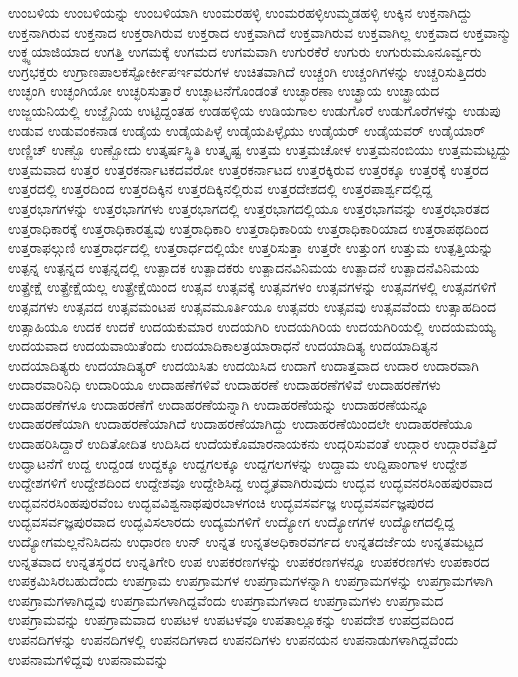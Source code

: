 {ಉಂಬಳಿಯ
ಉಂಬಳಿಯನ್ನು
ಉಂಬಳಿಯಾಗಿ
ಉಂಮರಹಳ್ಳಿ
ಉಂಮರಹಳ್ಳಿಉಮ್ಮಡಹಳ್ಳಿ
ಉಕ್ಕಿನ
ಉಕ್ತನಾಗಿದ್ದು
ಉಕ್ತನಾಗಿರುವ
ಉಕ್ತನಾದ
ಉಕ್ತರಾಗಿರುವ
ಉಕ್ತರಾದ
ಉಕ್ತವಾಗಿದೆ
ಉಕ್ತವಾಗಿರುವ
ಉಕ್ತವಾಗಿಲ್ಲ
ಉಕ್ತವಾದ
ಉಕ್ತವಾನ್ಮು
ಉಕ್ಥ್ಯಯಾಜಿಯಾದ
ಉಗತ್ತಿ
ಉಗಮಕ್ಕೆ
ಉಗಮದ
ಉಗಮವಾಗಿ
ಉಗುರಕೆರೆ
ಉಗುರು
ಉಗುರುಮೂನೂರ್ವ್ವರು
ಉಗ್ರಭಕ್ತರು
ಉಗ್ರಾಣಪಾಲಕಸ್ಟೋರ್ಕೀಪರ್ಇವರುಗಳ
ಉಚಿತವಾಗಿದೆ
ಉಚ್ಚಂಗಿ
ಉಚ್ಚಂಗಿಗಳನ್ನು
ಉಚ್ಚರಿಸುತ್ತಿದರು
ಉಚ್ಛಂಗಿ
ಉಚ್ಛಂಗಿಯೋ
ಉಚ್ಛರಿಸುತ್ತಾರೆ
ಉಚ್ಛಾಟನೆಗೊಂಡಂತೆ
ಉಚ್ಛಾರಣಾ
ಉಚ್ಛ್ರಾಯ
ಉಚ್ಛ್ರಾಯದ
ಉಜ್ಜಯನಿಯಲ್ಲಿ
ಉಜ್ಜೈನಿಯ
ಉಟ್ಟಿದ್ದಂತಹ
ಉಡಹಳ್ಳಿಯ
ಉಡಿಯಗಾಲ
ಉಡುಗೊರೆ
ಉಡುಗೊರೆಗಳನ್ನು
ಉಡುಪು
ಉಡುವ
ಉಡುವಂಕನಾಡ
ಉಡೈಯ
ಉಡೈಯಪಿಳ್ಳೆ
ಉಡೈಯಪಿಳ್ಳೈಯು
ಉಡೈಯರ್
ಉಡೈಯವರ್
ಉಡೈಯಾರ್
ಉಣ್ಣಿಚ್
ಉಣ್ಬೊ
ಉಣ್ಬೋದು
ಉತ್ಕರ್ಷಸ್ಥಿತಿ
ಉತ್ಕೃಷ್ಟ
ಉತ್ತಮ
ಉತ್ತಮಚೋಳ
ಉತ್ತಮನಂಬಿಯು
ಉತ್ತಮಮಟ್ಟದ್ದು
ಉತ್ತಮವಾದ
ಉತ್ತರ
ಉತ್ತರಕರ್ನಾಟಕದವರೋ
ಉತ್ತರಕರ್ನಾಟದ
ಉತ್ತರಕ್ಕಿರುವ
ಉತ್ತರಕ್ಕೂ
ಉತ್ತರಕ್ಕೆ
ಉತ್ತರದ
ಉತ್ತರದಲ್ಲಿ
ಉತ್ತರದಿಂದ
ಉತ್ತರದಿಕ್ಕಿನ
ಉತ್ತರದಿಕ್ಕಿನಲ್ಲಿರುವ
ಉತ್ತರದೇಶದಲ್ಲಿ
ಉತ್ತರಪಾರ್ಶ್ವದಲ್ಲಿದ್ದ
ಉತ್ತರಭಾಗಗಳನ್ನು
ಉತ್ತರಭಾಗಗಳು
ಉತ್ತರಭಾಗದಲ್ಲಿ
ಉತ್ತರಭಾಗದಲ್ಲಿಯೂ
ಉತ್ತರಭಾಗವನ್ನು
ಉತ್ತರಭಾರತದ
ಉತ್ತರಾಧಿಕಾರಕ್ಕೆ
ಉತ್ತರಾಧಿಕಾರತ್ವವು
ಉತ್ತರಾಧಿಕಾರಿ
ಉತ್ತರಾಧಿಕಾರಿಯ
ಉತ್ತರಾಧಿಕಾರಿಯಾದ
ಉತ್ತರಾಪಥದಿಂದ
ಉತ್ತರಾಫಲ್ಗುಣಿ
ಉತ್ತರಾರ್ಧದಲ್ಲಿ
ಉತ್ತರಾರ್ಧದಲ್ಲಿಯೇ
ಉತ್ತರಿಸುತ್ತಾ
ಉತ್ತರೇ
ಉತ್ತುಂಗ
ಉತ್ತುಮ
ಉತ್ಪತ್ತಿಯನ್ನು
ಉತ್ಪನ್ನ
ಉತ್ಪನ್ನದ
ಉತ್ಪನ್ನದಲ್ಲಿ
ಉತ್ಪಾದಕ
ಉತ್ಪಾದಕರು
ಉತ್ಪಾದನವಿನಿಮಯ
ಉತ್ಪಾದನೆ
ಉತ್ಪಾದನೆವಿನಿಮಯ
ಉತ್ಪ್ರೇಕ್ಷೆ
ಉತ್ಪ್ರೇಕ್ಷೆಯಲ್ಲ
ಉತ್ಪ್ರೇಕ್ಷೆಯಿಂದ
ಉತ್ಸವ
ಉತ್ಸವಕ್ಕೆ
ಉತ್ಸವಗಳಂ
ಉತ್ಸವಗಳನ್ನು
ಉತ್ಸವಗಳಲ್ಲಿ
ಉತ್ಸವಗಳಿಗೆ
ಉತ್ಸವಗಳು
ಉತ್ಸವದ
ಉತ್ಸವಮಂಟಪ
ಉತ್ಸವಮೂರ್ತಿಯೂ
ಉತ್ಸವರು
ಉತ್ಸವವು
ಉತ್ಸವವೆಂದು
ಉತ್ಸಾಹದಿಂದ
ಉತ್ಸಾಹಿಯೂ
ಉದಕ
ಉದಕೆ
ಉದಯಕುಮಾರ
ಉದಯಗಿರಿ
ಉದಯಗಿರಿಯ
ಉದಯಗಿರಿಯಲ್ಲಿ
ಉದಯಮಯ್ಯ
ಉದಯವಾದ
ಉದಯವಾಯಿತೆಂದು
ಉದಯಾದಿಕಾಲತ್ರಯಾರಾಧನೆ
ಉದಯಾದಿತ್ಯ
ಉದಯಾದಿತ್ಯನ
ಉದಯಾದಿತ್ಯರು
ಉದಯಾದಿತ್ಯರ್
ಉದಯಿಸಿತು
ಉದಯಿಸಿದ
ಉದಾಗೆ
ಉದಾತ್ತವಾದ
ಉದಾರ
ಉದಾರವಾಗಿ
ಉದಾರವಾರಿನಿಧಿ
ಉದಾರಿಯೂ
ಉದಾಹಣೆಗಳಿವೆ
ಉದಾಹರಣೆ
ಉದಾಹರಣೆಗಳಿವೆ
ಉದಾಹರಣೆಗಳು
ಉದಾಹರಣೆಗಳೂ
ಉದಾಹರಣೆಗೆ
ಉದಾಹರಣೆಯನ್ನಾಗಿ
ಉದಾಹರಣೆಯನ್ನು
ಉದಾಹರಣೆಯನ್ನೂ
ಉದಾಹರಣೆಯಾಗಿ
ಉದಾಹರಣೆಯಾಗಿದೆ
ಉದಾಹರಣೆಯಾಗಿದ್ದು
ಉದಾಹರಣೆಯಿಂದಲೇ
ಉದಾಹರಣೆಯೂ
ಉದಾಹರಿಸಿದ್ದಾರೆ
ಉದಿತೋದಿತ
ಉದಿಸಿದ
ಉದೆಯಕೊಮಾರನಾಯಕನು
ಉದ್ಗರಿಸುವಂತೆ
ಉದ್ಗಾರ
ಉದ್ಗಾರವೆತ್ತಿದೆ
ಉದ್ಘಾಟನೆಗೆ
ಉದ್ದ
ಉದ್ದಂಡ
ಉದ್ದಕ್ಕೂ
ಉದ್ದಗಲಕ್ಕೂ
ಉದ್ದಗಲಗಳನ್ನು
ಉದ್ದಾಮ
ಉದ್ದಿಪಾಂಗಾಳ
ಉದ್ದೇಶ
ಉದ್ದೇಶಗಳಿಗೆ
ಉದ್ದೇಶದಿಂದ
ಉದ್ದೇಶವೂ
ಉದ್ದೇಶಿಸಿದ್ದ
ಉದ್ಧೃತವಾಗಿರುವುದು
ಉದ್ಭವ
ಉದ್ಭವನರಸಿಂಹಪುರವಾದ
ಉದ್ಭವನರಸಿಂಹಪುರವೆಂಬ
ಉದ್ಭವವಿಶ್ವನಾಥಪುರಬಾಳಗಂಚಿ
ಉದ್ಭವಸರ್ವಜ್ಞ
ಉದ್ಭವಸರ್ವಜ್ಞಪುರದ
ಉದ್ಭವಸರ್ವಜ್ಞಪುರವಾದ
ಉದ್ಭವಿಸಲಾರದು
ಉದ್ಯಮಗಳಿಗೆ
ಉದ್ಯೋಗ
ಉದ್ಯೋಗಗಳ
ಉದ್ಯೋಗದಲ್ಲಿದ್ದ
ಉದ್ಯೋಗಮಲ್ಲನೆನಿಸಿದನು
ಉಧಾರಣ
ಉನ್
ಉನ್ನತ
ಉನ್ನತಅಧಿಕಾರವರ್ಗದ
ಉನ್ನತದರ್ಜೆಯ
ಉನ್ನತಮಟ್ಟದ
ಉನ್ನತವಾದ
ಉನ್ನತಸ್ಥರದ
ಉನ್ನತಿಗೇರಿ
ಉಪ
ಉಪಕರಣಗಳನ್ನು
ಉಪಕರಣಗಳನ್ನೂ
ಉಪಕರಣಗಳು
ಉಪಕಾರದ
ಉಪಕ್ರಮಿಸಿರಬಹುದೆಂದು
ಉಪಗ್ರಾಮ
ಉಪಗ್ರಾಮಗಳ
ಉಪಗ್ರಾಮಗಳನ್ನಾಗಿ
ಉಪಗ್ರಾಮಗಳನ್ನು
ಉಪಗ್ರಾಮಗಳಾಗಿ
ಉಪಗ್ರಾಮಗಳಾಗಿದ್ದವು
ಉಪಗ್ರಾಮಗಳಾಗಿದ್ದವೆಂದು
ಉಪಗ್ರಾಮಗಳಾದ
ಉಪಗ್ರಾಮಗಳು
ಉಪಗ್ರಾಮದ
ಉಪಗ್ರಾಮವನ್ನು
ಉಪಗ್ರಾಮವಾದ
ಉಪಟಳ
ಉಪಟಳವೂ
ಉಪತಾಲ್ಲೂಕನ್ನು
ಉಪದೇಶ
ಉಪದ್ರವದಿಂದ
ಉಪನದಿಗಳನ್ನು
ಉಪನದಿಗಳಲ್ಲಿ
ಉಪನದಿಗಳಾದ
ಉಪನದಿಗಳು
ಉಪನಯನ
ಉಪನಾಡುಗಳಾಗಿದ್ದವೆಂದು
ಉಪನಾಮಗಳಿದ್ದವು
ಉಪನಾಮವನ್ನು
}
